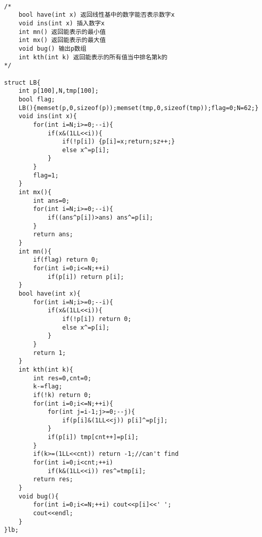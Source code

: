 \begin{lstlisting}

/*
	bool have(int x) 返回线性基中的数字能否表示数字x
	void ins(int x) 插入数字x
	int mn() 返回能表示的最小值
	int mx() 返回能表示的最大值
	void bug() 输出p数组
	int kth(int k) 返回能表示的所有值当中排名第k的
*/

struct LB{
	int p[100],N,tmp[100];
	bool flag;
	LB(){memset(p,0,sizeof(p));memset(tmp,0,sizeof(tmp));flag=0;N=62;}
	void ins(int x){
		for(int i=N;i>=0;--i){
			if(x&(1LL<<i)){
				if(!p[i]) {p[i]=x;return;sz++;}
				else x^=p[i];
			}
		}
		flag=1;
	}
	int mx(){
		int ans=0;
		for(int i=N;i>=0;--i){
			if((ans^p[i])>ans) ans^=p[i];
		}
		return ans;
	}
	int mn(){
		if(flag) return 0;
		for(int i=0;i<=N;++i)
			if(p[i]) return p[i];
	}
	bool have(int x){
		for(int i=N;i>=0;--i){
			if(x&(1LL<<i)){
				if(!p[i]) return 0;
				else x^=p[i];
			}
		}
		return 1;
	}
	int kth(int k){
		int res=0,cnt=0;
		k-=flag;
		if(!k) return 0;
		for(int i=0;i<=N;++i){
			for(int j=i-1;j>=0;--j){
				if(p[i]&(1LL<<j)) p[i]^=p[j];
			}
			if(p[i]) tmp[cnt++]=p[i];
		}
		if(k>=(1LL<<cnt)) return -1;//can't find
		for(int i=0;i<cnt;++i)
			if(k&(1LL<<i)) res^=tmp[i];
		return res;
	}
	void bug(){
		for(int i=0;i<=N;++i) cout<<p[i]<<' ';
		cout<<endl;
	}
}lb;
\end{lstlisting}